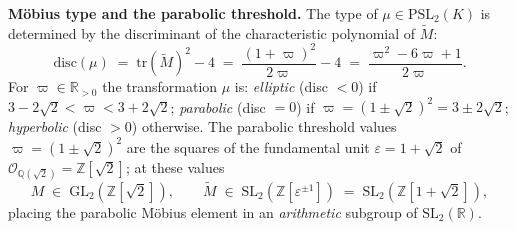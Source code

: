 \begin{remark}
\medskip
\noindent\textbf{M\"obius type and the parabolic threshold.}\;
The type of $\mu\in\mathrm{PSL}_2(K)$ is determined by the
discriminant of the characteristic polynomial of $\widetilde{M}$:
\begin{equation}\label{eq:mobius-discriminant}
  \mathrm{disc}(\mu) \;=\;
  \mathrm{tr}(\widetilde{M})^2 - 4
  \;=\; \frac{(1+\varpi)^2}{2\varpi}-4
  \;=\; \frac{\varpi^2-6\varpi+1}{2\varpi}.
\end{equation}
For $\varpi\in\mathbb{R}_{>0}$ the transformation $\mu$ is:
\emph{elliptic} (disc $<0$) if $3-2\sqrt{2}<\varpi<3+2\sqrt{2}$;
\emph{parabolic} (disc $=0$) if $\varpi = (1\pm\sqrt{2})^2 = 3\pm 2\sqrt{2}$;
\emph{hyperbolic} (disc $>0$) otherwise.
The parabolic threshold values $\varpi=(1\pm\sqrt{2})^2$ are the
squares of the fundamental unit $\varepsilon=1+\sqrt{2}$ of
$\mathcal{O}_{\mathbb{Q}(\sqrt{2})}=\mathbb{Z}[\sqrt{2}]$; at these
values
\begin{equation}\label{eq:parabolic-ring}
  M \;\in\; \mathrm{GL}_2(\mathbb{Z}[\sqrt{2}]),
  \qquad
  \widetilde{M} \;\in\;
  \mathrm{SL}_2(\mathbb{Z}[\varepsilon^{\pm 1}])
  \;=\; \mathrm{SL}_2(\mathbb{Z}[1+\sqrt{2}]),
\end{equation}
placing the parabolic M\"obius element in an \emph{arithmetic} subgroup
of $\mathrm{SL}_2(\mathbb{R})$.
\end{remark}

